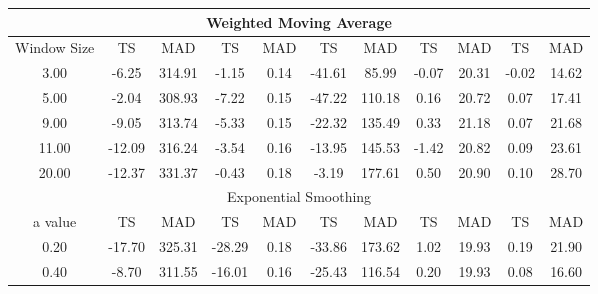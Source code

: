 \documentclass[conference,onecolumn]{IEEEtran}
\begin{document}
\begin{table}[ht]
\begin{tabular}{|c|c|c|c|c|c|c|c|c|c|c|}
\multicolumn{11}{|c|}{Weighted Moving Average}                                                                                                                                                         \\ \hline
Window Size & TS               & MAD              & TS                 & MAD             & TS              & MAD            & TS               & MAD             & TS               & MAD              \\ \hline
3.00        & -6.25            & 314.91           & -1.15              & 0.14            & -41.61          & 85.99          & -0.07            & 20.31           & -0.02            & 14.62            \\ \hline
5.00        & -2.04            & 308.93           & -7.22              & 0.15            & -47.22          & 110.18         & 0.16             & 20.72           & 0.07             & 17.41            \\ \hline
9.00        & -9.05            & 313.74           & -5.33              & 0.15            & -22.32          & 135.49         & 0.33             & 21.18           & 0.07             & 21.68            \\ \hline
11.00       & -12.09           & 316.24           & -3.54              & 0.16            & -13.95          & 145.53         & -1.42            & 20.82           & 0.09             & 23.61            \\ \hline
20.00       & -12.37           & 331.37           & -0.43              & 0.18            & -3.19           & 177.61         & 0.50             & 20.90           & 0.10             & 28.70            \\ \hline
\multicolumn{11}{|c|}{Exponential Smoothing}                                                                                                                                                           \\ \hline
a value     & TS               & MAD              & TS                 & MAD             & TS              & MAD            & TS               & MAD             & TS               & MAD              \\ \hline
0.20        & -17.70           & 325.31           & -28.29             & 0.18            & -33.86          & 173.62         & 1.02             & 19.93           & 0.19             & 21.90            \\ \hline
0.40        & -8.70            & 311.55           & -16.01             & 0.16            & -25.43          & 116.54         & 0.20             & 19.93           & 0.08             & 16.60            \\ \hline

\end{tabular}
\end{table}
\end{document}
